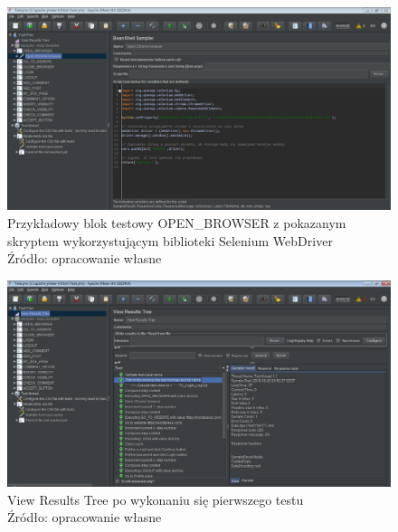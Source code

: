 \begin{figure}[H]
\centering
\captionsetup{justification=centering}
\includegraphics[width=1\textwidth]{Exmpl1.PNG}
\caption[Przykładowy building block OPEN\_BROWSER z pokazanym skryptem wykorzystującym biblioteki Selenium WebDriver]{\label{fig:ham}Przykładowy blok testowy OPEN\_BROWSER z pokazanym skryptem wykorzystującym biblioteki Selenium WebDriver \\ Źródło: opracowanie własne}
\end{figure}

\begin{figure}[H]
\centering
\captionsetup{justification=centering}
\includegraphics[width=1\textwidth]{Exmpl2.PNG}
\caption[View Results Tree po wykonaniu się pierwszego testu]{\label{fig:ham}View Results Tree po wykonaniu się pierwszego testu \\ Źródło: opracowanie własne}
\end{figure}








